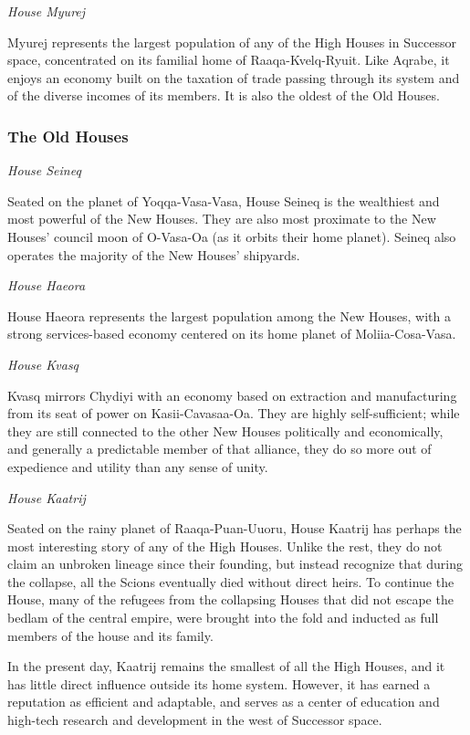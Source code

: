 \documentclass[11pt]{report}
\begin{document}
    \noindent
    \emph{House Myurej}

    Myurej represents the largest population of any of the High Houses in Successor space, concentrated on its familial home of Raaqa-Kvelq-Ryuit. Like Aqrabe, it enjoys an economy built on the taxation of trade passing through its system and of the diverse incomes of its members. It is also the oldest of the Old Houses. 
    \bigskip

    \subsubsection{The Old Houses}

    \noindent
    \emph{House Seineq}

    Seated on the planet of Yoqqa-Vasa-Vasa, House Seineq is the wealthiest and most powerful of the New Houses. They are also most proximate to the New Houses' council moon of O-Vasa-Oa (as it orbits their home planet). Seineq also operates the majority of the New Houses' shipyards.
    \bigskip

    \noindent
    \emph{House Haeora}

    House Haeora represents the largest population among the New Houses, with a strong services-based economy centered on its home planet of Moliia-Cosa-Vasa.
    \bigskip

    \noindent
    \emph{House Kvasq}

    Kvasq mirrors Chydiyi with an economy based on extraction and manufacturing from its seat of power on Kasii-Cavasaa-Oa. They are highly self-sufficient; while they are still connected to the other New Houses politically and economically, and generally a predictable member of that alliance, they do so more out of expedience and utility than any sense of unity.
    \bigskip

    \noindent
    \emph{House Kaatrij}

    Seated on the rainy planet of Raaqa-Puan-Uuoru, House Kaatrij has perhaps the most interesting story of any of the High Houses. Unlike the rest, they do not claim an unbroken lineage since their founding, but instead recognize that during the collapse, all the Scions eventually died without direct heirs. To continue the House, many of the refugees from the collapsing Houses that did not escape the bedlam of the central empire, were brought into the fold and inducted as full members of the house and its family.

    In the present day, Kaatrij remains the smallest of all the High Houses, and it has little direct influence outside its home system. However, it has earned a reputation as efficient and adaptable, and serves as a center of education and high-tech research and development in the west of Successor space.
\end{document}
